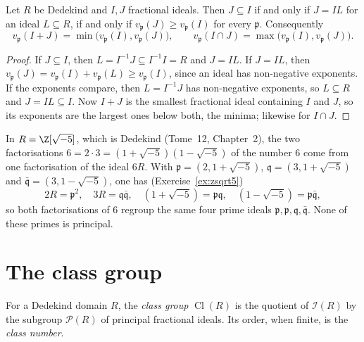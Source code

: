 \begin{corollary}\label{cor:contain}
Let $R$ be Dedekind and $I,J$ fractional ideals. Then $J\subseteq I$ if and only if $J=IL$ for an ideal $L\subseteq R$, if and only if $v_{\mathfrak p}(J)\ge v_{\mathfrak p}(I)$ for every $\mathfrak p$. Consequently
\[
v_{\mathfrak p}(I+J)=\min\bigl(v_{\mathfrak p}(I),v_{\mathfrak p}(J)\bigr),\qquad v_{\mathfrak p}(I\cap J)=\max\bigl(v_{\mathfrak p}(I),v_{\mathfrak p}(J)\bigr).
\]
\end{corollary}

\begin{proof}
If $J\subseteq I$, then $L=I^{-1}J\subseteq I^{-1}I=R$ and $J=IL$. If $J=IL$, then $v_{\mathfrak p}(J)=v_{\mathfrak p}(I)+v_{\mathfrak p}(L)\ge v_{\mathfrak p}(I)$, since an ideal has non-negative exponents. If the exponents compare, then $L=I^{-1}J$
has non-negative exponents, so $L\subseteq R$ and $J=IL\subseteq I$. Now $I+J$ is the smallest fractional ideal containing $I$ and $J$, so its exponents are the largest ones below both, the minima; likewise for $I\cap J$.
\end{proof}

\begin{example}\label{ex:sixtwice}
In $R=\Z[\sqrt{-5}]$, which is Dedekind (Tome~12, Chapter~2), the two factorisations $6=2\cdot3=(1+\sqrt{-5})(1-\sqrt{-5})$ of the number $6$ come from one factorisation of the ideal $6R$. With
$\mathfrak p=(2,1+\sqrt{-5})$, $\mathfrak q=(3,1+\sqrt{-5})$ and $\bar{\mathfrak q}=(3,1-\sqrt{-5})$, one has (Exercise~\ref{ex:zsqrt5})
\[
2R=\mathfrak p^2,\quad 3R=\mathfrak q\bar{\mathfrak q},\quad (1+\sqrt{-5})=\mathfrak p\mathfrak q,\quad(1-\sqrt{-5})=\mathfrak p\bar{\mathfrak q},
\]
so both factorisations of $6$ regroup the same four prime ideals $\mathfrak p,\mathfrak p,\mathfrak q,\bar{\mathfrak q}$. None of these primes is principal.
\end{example}

\section{The class group}

\begin{definition}\label{def:classgroup}
For a Dedekind domain $R$, the \emph{class group} $\operatorname{Cl}(R)$ is the quotient of $\mathcal I(R)$ by the subgroup $\mathcal P(R)$ of principal fractional ideals. Its order, when finite, is the \emph{class number}.
\end{definition}

